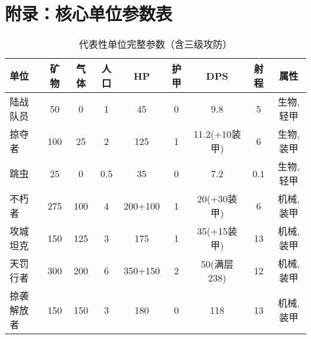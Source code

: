 \documentclass[a4paper,12pt]{article}
\begin{document}
\appendix
\section{附录：核心单位参数表}

\begin{table}[h]
\centering
\caption{代表性单位完整参数（含三级攻防）}
\scriptsize
\begin{tabular}{lcccccccc}
\toprule
\textbf{单位} & \textbf{矿物} & \textbf{气体} & \textbf{人口} & \textbf{HP} & \textbf{护甲} & \textbf{DPS} & \textbf{射程} & \textbf{属性} \\
\midrule
陆战队员 & 50 & 0 & 1 & 45 & 0 & 9.8 & 5 & 生物,轻甲 \\
掠夺者 & 100 & 25 & 2 & 125 & 1 & 11.2(+10装甲) & 6 & 生物,装甲 \\
跳虫 & 25 & 0 & 0.5 & 35 & 0 & 7.2 & 0.1 & 生物,轻甲 \\
不朽者 & 275 & 100 & 4 & 200+100 & 1 & 20(+30装甲) & 6 & 机械,装甲 \\
攻城坦克 & 150 & 125 & 3 & 175 & 1 & 35(+15装甲) & 13 & 机械,装甲 \\
天罚行者 & 300 & 200 & 6 & 350+150 & 2 & 50(满层238) & 12 & 机械,装甲 \\
掠袭解放者 & 150 & 150 & 3 & 180 & 0 & 118 & 13 & 机械,装甲 \\
\bottomrule
\end{tabular}
\end{table}
\end{document}
